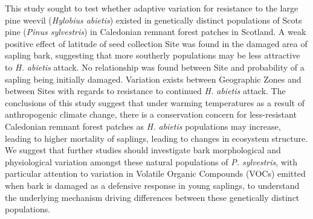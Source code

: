 \documentclass[a4paper, 11pt]{article}
\begin{document}
This study sought to test whether adaptive variation for resistance to the large pine weevil (\textit{Hylobius abietis}) existed in genetically distinct populations of Scots pine (\textit{Pinus sylvestris}) in Caledonian remnant forest patches in Scotland. A weak positive effect of latitude of seed collection Site was found in the damaged area of sapling bark, suggesting that more southerly populations may be less attractive to \textit{H. abietis} attack. No relationship was found between Site and probability of a sapling being initially damaged. Variation exists between Geographic Zones and between Sites with regards to resistance to continued \textit{H. abietis} attack. The conclusions of this study suggest that under warming temperatures as a result of anthropogenic climate change, there is a conservation concern for less-resistant Caledonian remnant forest patches as \textit{H. abietis} populations may increase, leading to higher mortality of saplings, leading to changes in ecosystem structure. We suggest that further studies should investigate bark morphological and physiological variation amongst these natural populations of \textit{P. sylvestris}, with particular attention to variation in Volatile Organic Compounds (VOCs) emitted when bark is damaged as a defensive response in young saplings, to understand the underlying mechanism driving differences between these genetically distinct populations.



\end{document}
